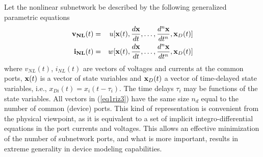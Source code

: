 Let the nonlinear subnetwork be described by the following generalized
parametric equations~\cite{rizzoli:92:1}
\begin{eqnarray}
  {\bf v_{NL}}(t) &=& u[{\bf x}(t), \frac{d{\bf x}}{dt}, \dots , 
                 \frac{d^n{\bf x}}{dt^n}, {\bf x}_D(t)] \\
  {\bf i_{NL}}(t) &=& w[{\bf x}(t), \frac{d{\bf x}}{dt}, \dots ,
                 \frac{d^n{\bf x}}{dt^n}, {\bf x}_D(t)] 
  \label{eq1riz3}
\end{eqnarray}
where $v_{NL}(t)$, $i_{NL}(t)$ are vectors of voltages and currents at
the common ports, ${\bf x}(t)$ is a vector of state variables and
${\bf x}_D(t)$ a vector of time-delayed state variables, i.e.,
$x_{Di}(t)=x_i(t-\tau_i)$. The time delays $\tau_i$ may be functions
of the state variables. All vectors in (\ref{eq1riz3}) have the same
size $n_d$ equal to the number of common (device) ports. This kind of
representation is convenient from the physical viewpoint, as it is
equivalent to a set of implicit integro-differential equations in the
port currents and voltages. This allows an effective minimization of
the number of subnetwork ports, and what is more important, results in
extreme generality in device modeling capabilities.

